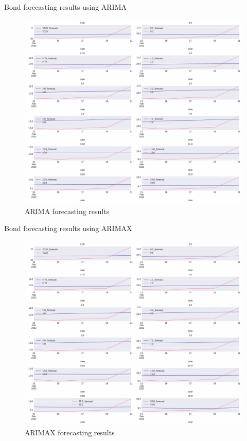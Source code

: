 \documentclass[aspectratio=169]{beamer}
\begin{document}
    \begin{frame}{Bond forecasting results using ARIMA}
        \begin{figure}
            \includegraphics[scale=0.22]{fig/ARIMAbondsfcst.pdf}
            \caption{ARIMA forecasting results}
            \label{fig:VARnsfcst}
        \end{figure}
    \end{frame}

    \begin{frame}{Bond forecasting results using ARIMAX}
        \begin{figure}
            \includegraphics[scale=0.22]{fig/ARIMAX_MSFRCST.pdf}
            \caption{ARIMAX forecasting results}
            \label{fig:VARnsfcst}
        \end{figure}
    \end{frame}
\end{document}
